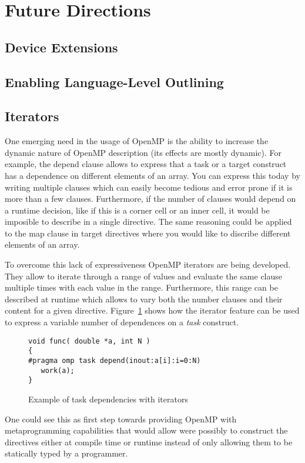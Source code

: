 \section{Future Directions}
\label{sec:future_directions}

\subsection{Device Extensions}
\label{sub:device_extensions}

\subsection{Enabling Language-Level Outlining}
\label{sub:enabling_language_level_outlining}

\subsection{Iterators}
\label{sub:iterators}

One emerging need in the usage of OpenMP is the ability to increase the dynamic nature of OpenMP description (its effects are mostly dynamic). For example, the depend clause allows to express that a task or a target construct has a dependence on different elements of an array. You can express this today by writing multiple clauses which can easily become tedious and error prone if it is more than a few clauses. Furthermore, if the number of clauses would depend on a runtime decision, like if this is a corner cell or an inner cell, it would be imposible to describe in a single directive. The same reasoning could be applied to the map clause in target directives where you would like to discribe different elements of an array.
   
To overcome this lack of expressiveness OpenMP iterators are being developed. They allow to iterate through a range of values and evaluate the same clause multiple times with each value in the range. Furthermore, this range can be described at runtime which allows to vary both the number clauses and their content for a given directive. Figure~\ref{fig:iterators} shows how the iterator feature can be used to express a variable number of dependences on a \emph{task} construct.

\begin{figure}
\begin{lstlisting}
void func( double *a, int N )
{
#pragma omp task depend(inout:a[i]:i=0:N)
   work(a);
}
\end{lstlisting}
\caption{Example of task dependencies with iterators}
\label{fig:iterators}
\end{figure}
   
One could see this as first step towards providing OpenMP with metaprogramming capabilities that would allow were possibly to construct the directives either at compile time or runtime instead of only allowing them to be statically typed by a programmer.
   

